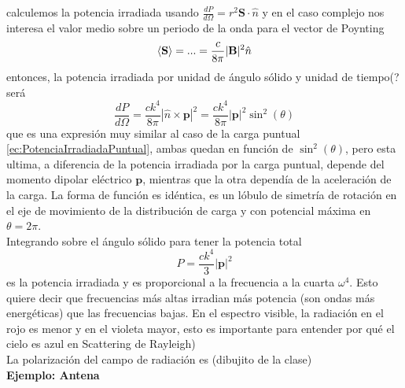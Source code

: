 %
%
%
%
calculemos la potencia irradiada usando $\frac{dP}{d\Omega} = r^{2} \textbf{S}\cdot \hat{n}$ y en el caso complejo nos interesa el valor medio sobre un periodo de la onda para el vector de Poynting
\begin{equation*}
    \left\langle \textbf{S} \right\rangle = ... = \frac{c}{8\pi} |\textbf{B}|^{2}\hat{n}
\end{equation*}
entonces, la potencia irradiada por unidad de ángulo sólido y unidad de tiempo(? será
\begin{equation}
    \frac{dP}{d\Omega}
    = \frac{ck^{4}}{8\pi}|\hat{n}\times \textbf{p}|^{2}
    = \frac{ck^{4}}{8\pi}|\textbf{p}|^{2}\sin^{2}{(\theta)}
        \label{ec:PotenciaIrradiadaDipolarElectrico}
\end{equation}
que es una expresión muy similar al caso de la carga puntual \eqref{ec:PotenciaIrradiadaPuntual}, ambas quedan en función de $\sin^{2}{(\theta)}$, pero esta ultima, a diferencia de la potencia irradiada por la carga puntual, depende del momento dipolar eléctrico $\textbf{p}$, mientras que la otra dependía de la aceleración de la carga. La forma de función es idéntica, es un lóbulo de simetría de rotación en el eje de movimiento de la distribución de carga y con potencial máxima en $\theta = 2\pi$.\\ \indent Integrando sobre el ángulo sólido para tener la potencia total
\begin{equation*}
    P = \frac{ck^{4}}{3}|\textbf{p}|^{2}
\end{equation*}
es la potencia irradiada y es proporcional a la frecuencia a la cuarta $\omega^{4}$. Esto quiere decir que frecuencias más altas irradian más potencia (son ondas más energéticas) que las frecuencias bajas. En el espectro visible, la radiación en el rojo es menor y en el violeta mayor, esto es importante para entender por qué el cielo es azul en Scattering de Rayleigh)\\
\indent La polarización del campo de radiación es (dibujito de la clase)\\
\textbf{Ejemplo: Antena}





